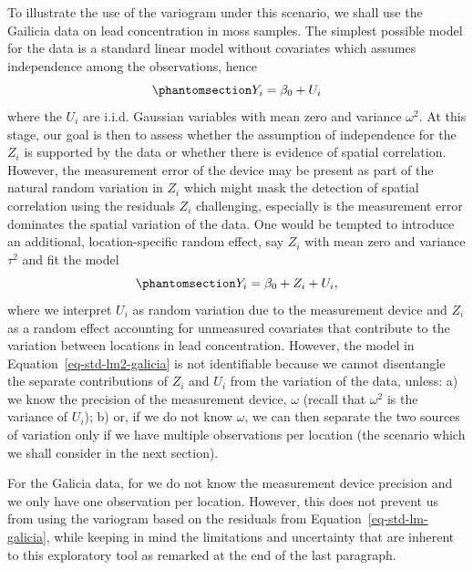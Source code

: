 \documentclass[
  letterpaper,
]{krantz}
\begin{document}
To illustrate the use of the variogram under this scenario, we shall use
the Gailicia data on lead concentration in moss samples. The simplest
possible model for the data is a standard linear model without
covariates which assumes independence among the observations, hence
\begin{equation}\phantomsection\label{eq-std-lm-galicia}{
Y_i = \beta_0 + U_i
}\end{equation} where the \(U_i\) are i.i.d. Gaussian variables with
mean zero and variance \(\omega^2\). At this stage, our goal is then to
assess whether the assumption of independence for the \(Z_i\) is
supported by the data or whether there is evidence of spatial
correlation. However, the measurement error of the device may be present
as part of the natural random variation in \(Z_i\) which might mask the
detection of spatial correlation using the residuals \(Z_i\)
challenging, especially is the measurement error dominates the spatial
variation of the data. One would be tempted to introduce an additional,
location-specific random effect, say \(Z_i\) with mean zero and variance
\(\tau^2\) and fit the model
\begin{equation}\phantomsection\label{eq-std-lm2-galicia}{
Y_i = \beta_0 + Z_i + U_i,
}\end{equation} where we interpret \(U_i\) as random variation due to
the measurement device and \(Z_i\) as a random effect accounting for
unmeasured covariates that contribute to the variation between locations
in lead concentration. However, the model in
Equation~\ref{eq-std-lm2-galicia} is not identifiable because we cannot
disentangle the separate contributions of \(Z_i\) and \(U_i\) from the
variation of the data, unless: a) we know the precision of the
measurement device, \(\omega\) (recall that \(\omega^2\) is the variance
of \(U_i\)); b) or, if we do not know \(\omega\), we can then separate
the two sources of variation only if we have multiple observations per
location (the scenario which we shall consider in the next section).

For the Galicia data, for we do not know the measurement device
precision and we only have one observation per location. However, this
does not prevent us from using the variogram based on the residuals from
Equation~\ref{eq-std-lm-galicia}, while keeping in mind the limitations
and uncertainty that are inherent to this exploratory tool as remarked
at the end of the last paragraph.
\end{document}

